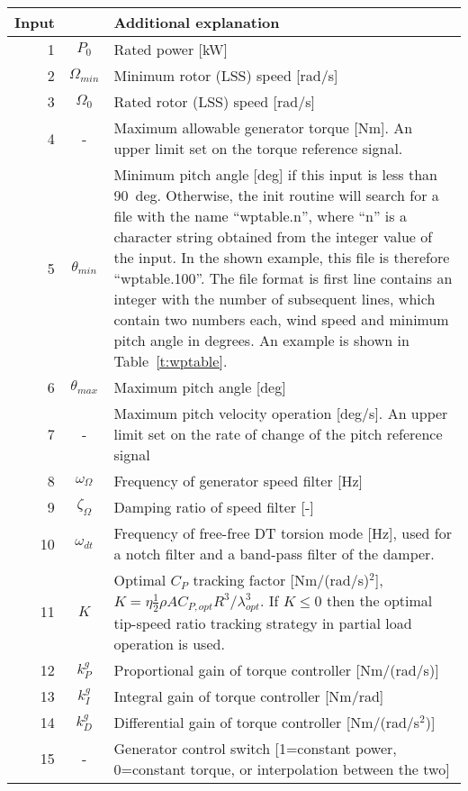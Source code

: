 \begin{table}[t]
\begin{center}
\begin{tabular}{r|c|p{11.5cm}}
Input &  & Additional explanation \\ \hline
1 & $P_0$   			& Rated power [kW]\\
2 & $\Omega_{min}$& Minimum rotor (LSS) speed [rad/s]\\
3 & $\Omega_0$ 		& Rated rotor (LSS) speed [rad/s] \\
4 & -     				& Maximum allowable generator torque [Nm]. An upper limit set on the torque reference signal. \\
5 & $\theta_{min}$& Minimum pitch angle [deg] if this input is less than 90~deg. Otherwise, the init routine will search for a file with the name ``wptable.n'', where ``n'' is a character string obtained from the integer value of the input. In the shown example, this file is therefore ``wptable.100''. The file format is first line contains an integer with the number of subsequent lines, which contain two numbers each, wind speed and minimum pitch angle in degrees. An example is shown in Table~\ref{t:wptable}.\\
6 & $\theta_{max}$	& Maximum pitch angle [deg] \\
7 & - 				& Maximum pitch velocity operation [deg/s]. An upper limit set on the rate of change of the pitch reference signal\\
\hline
8 & $\omega_{\Omega}$ 	& Frequency of generator speed filter [Hz] \\
9 & $\zeta_{\Omega}$ 	& Damping ratio of speed filter [-] \\
10 & $\omega_{dt}$ 		& Frequency of free-free DT torsion mode [Hz], used for a notch filter and a band-pass filter of the damper. \\
\hline
11 & $K$ 			  & Optimal $C_P$ tracking factor [Nm/(rad/s)$^2$], $K=\eta \frac12 \rho A C_{P,opt} R^3/\lambda_{opt}^3$. If $K\le0$ then the optimal tip-speed ratio tracking strategy in partial load operation is used.\\
12 & $k_P^g$ 		& Proportional gain of torque controller [Nm/(rad/s)] \\
13 & $k_I^g$ 		& Integral gain of torque controller [Nm/rad] \\
14 & $k_D^g$ 		& Differential gain of torque controller [Nm/(rad/s$^2$)] \\
15 & - 			    & Generator control switch [1=constant power, 0=constant torque, or interpolation between the two] \\

\end{tabular}
\end{center}
\end{table}
